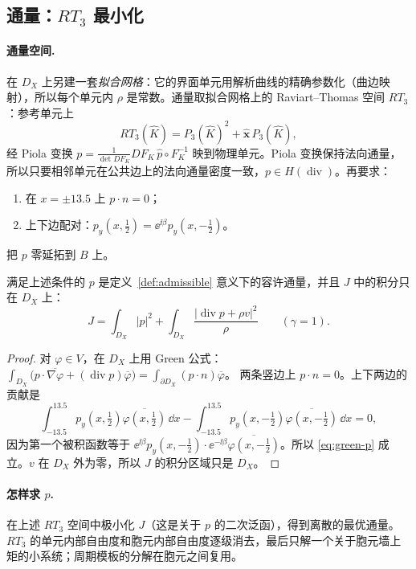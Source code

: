 \documentclass[11pt,a4paper,fontset=fandol]{ctexart}
\begin{document}
\subsection{通量：$RT_3$ 最小化}

\paragraph{通量空间.} 在 $D_X$ 上另建一套\emph{拟合网格}：它的界面单元用解析曲线的精确参数化（曲边映射），所以每个单元内 $\rho$ 是常数。通量取拟合网格上的 Raviart--Thomas 空间 $RT_3$：参考单元上
\[
RT_3(\widehat K)=P_3(\widehat K)^2+\widehat{\bm x}\,P_3(\widehat K),
\]
经 Piola 变换 $p=\frac{1}{\det DF_K}DF_K\,\widehat p\circ F_K^{-1}$ 映到物理单元。Piola 变换保持法向通量，所以只要相邻单元在公共边上的法向通量密度一致，$p\in H(\operatorname{div})$。再要求：
\begin{enumerate}
\item 在 $x=\pm13.5$ 上 $p\cdot n=0$；
\item 上下边配对：$p_y(x,\tfrac12)=\ee^{\ii\beta}p_y(x,-\tfrac12)$。
\end{enumerate}
把 $p$ 零延拓到 $B$ 上。

\begin{lemma}[容许性]
\label{lem:admissible}
满足上述条件的 $p$ 是定义~\ref{def:admissible} 意义下的容许通量，并且 $J$ 中的积分只在 $D_X$ 上：
\[
J=\int_{D_X}|p|^2+\int_{D_X}\frac{|\operatorname{div}p+\rho v|^2}{\rho}\qquad(\gamma=1).
\]
\end{lemma}

\begin{proof}
对 $\varphi\in V$，在 $D_X$ 上用 Green 公式：
$\int_{D_X}\bigl(p\cdot\overline{\nabla\varphi}+(\operatorname{div}p)\overline\varphi\bigr)=\int_{\partial D_X}(p\cdot n)\overline\varphi$。
两条竖边上 $p\cdot n=0$。上下两边的贡献是
\[
\int_{-13.5}^{13.5}p_y(x,\tfrac12)\overline{\varphi(x,\tfrac12)}\,\dd x-\int_{-13.5}^{13.5}p_y(x,-\tfrac12)\overline{\varphi(x,-\tfrac12)}\,\dd x=0 ,
\]
因为第一个被积函数等于 $\ee^{\ii\beta}p_y(x,-\tfrac12)\cdot\ee^{-\ii\beta}\overline{\varphi(x,-\tfrac12)}$。所以 \eqref{eq:green-p} 成立。$v$ 在 $D_X$ 外为零，所以 $J$ 的积分区域只是 $D_X$。
\end{proof}

\paragraph{怎样求 $p$.} 在上述 $RT_3$ 空间中极小化 $J$（这是关于 $p$ 的二次泛函），得到离散的最优通量。$RT_3$ 的单元内部自由度和胞元内部自由度逐级消去，最后只解一个关于胞元墙上矩的小系统；周期模板的分解在胞元之间复用。
\end{document}
